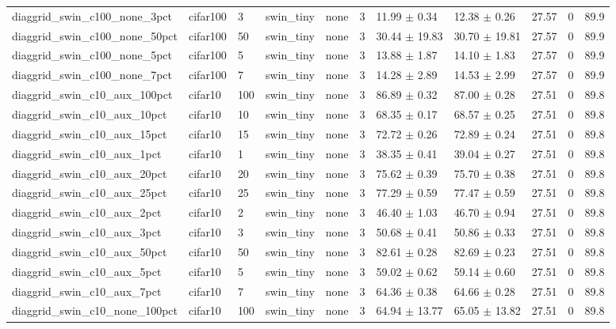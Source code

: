 \begin{tabular}{lllllllllll}
diaggrid_swin_c100_none_3pct & cifar100 & 3 & swin_tiny & none & 3 & 11.99 $\pm$ 0.34 & 12.38 $\pm$ 0.26 & 27.57 & 0 & 89.9 \\
diaggrid_swin_c100_none_50pct & cifar100 & 50 & swin_tiny & none & 3 & 30.44 $\pm$ 19.83 & 30.70 $\pm$ 19.81 & 27.57 & 0 & 89.9 \\
diaggrid_swin_c100_none_5pct & cifar100 & 5 & swin_tiny & none & 3 & 13.88 $\pm$ 1.87 & 14.10 $\pm$ 1.83 & 27.57 & 0 & 89.9 \\
diaggrid_swin_c100_none_7pct & cifar100 & 7 & swin_tiny & none & 3 & 14.28 $\pm$ 2.89 & 14.53 $\pm$ 2.99 & 27.57 & 0 & 89.9 \\
diaggrid_swin_c10_aux_100pct & cifar10 & 100 & swin_tiny & none & 3 & 86.89 $\pm$ 0.32 & 87.00 $\pm$ 0.28 & 27.51 & 0 & 89.8 \\
diaggrid_swin_c10_aux_10pct & cifar10 & 10 & swin_tiny & none & 3 & 68.35 $\pm$ 0.17 & 68.57 $\pm$ 0.25 & 27.51 & 0 & 89.8 \\
diaggrid_swin_c10_aux_15pct & cifar10 & 15 & swin_tiny & none & 3 & 72.72 $\pm$ 0.26 & 72.89 $\pm$ 0.24 & 27.51 & 0 & 89.8 \\
diaggrid_swin_c10_aux_1pct & cifar10 & 1 & swin_tiny & none & 3 & 38.35 $\pm$ 0.41 & 39.04 $\pm$ 0.27 & 27.51 & 0 & 89.8 \\
diaggrid_swin_c10_aux_20pct & cifar10 & 20 & swin_tiny & none & 3 & 75.62 $\pm$ 0.39 & 75.70 $\pm$ 0.38 & 27.51 & 0 & 89.8 \\
diaggrid_swin_c10_aux_25pct & cifar10 & 25 & swin_tiny & none & 3 & 77.29 $\pm$ 0.59 & 77.47 $\pm$ 0.59 & 27.51 & 0 & 89.8 \\
diaggrid_swin_c10_aux_2pct & cifar10 & 2 & swin_tiny & none & 3 & 46.40 $\pm$ 1.03 & 46.70 $\pm$ 0.94 & 27.51 & 0 & 89.8 \\
diaggrid_swin_c10_aux_3pct & cifar10 & 3 & swin_tiny & none & 3 & 50.68 $\pm$ 0.41 & 50.86 $\pm$ 0.33 & 27.51 & 0 & 89.8 \\
diaggrid_swin_c10_aux_50pct & cifar10 & 50 & swin_tiny & none & 3 & 82.61 $\pm$ 0.28 & 82.69 $\pm$ 0.23 & 27.51 & 0 & 89.8 \\
diaggrid_swin_c10_aux_5pct & cifar10 & 5 & swin_tiny & none & 3 & 59.02 $\pm$ 0.62 & 59.14 $\pm$ 0.60 & 27.51 & 0 & 89.8 \\
diaggrid_swin_c10_aux_7pct & cifar10 & 7 & swin_tiny & none & 3 & 64.36 $\pm$ 0.38 & 64.66 $\pm$ 0.28 & 27.51 & 0 & 89.8 \\
diaggrid_swin_c10_none_100pct & cifar10 & 100 & swin_tiny & none & 3 & 64.94 $\pm$ 13.77 & 65.05 $\pm$ 13.82 & 27.51 & 0 & 89.8 \\

\end{tabular}
